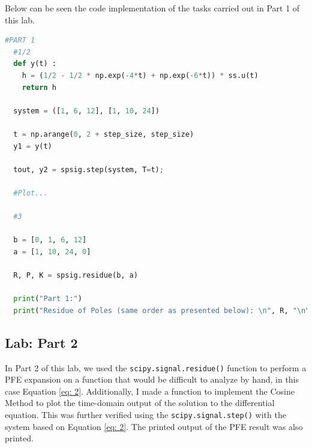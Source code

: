 \documentclass[12pt]{report}
\begin{document}
Below can be seen the code implementation of the tasks carried out in Part 1 of this lab.

\begin{lstlisting}[language=Python, basicstyle=\footnotesize]
  #PART 1
  #1/2
  def y(t) :
    h = (1/2 - 1/2 * np.exp(-4*t) + np.exp(-6*t)) * ss.u(t)
    return h

  system = ([1, 6, 12], [1, 10, 24])

  t = np.arange(0, 2 + step_size, step_size)
  y1 = y(t)        

  tout, y2 = spsig.step(system, T=t);

  #Plot...

  #3

  b = [0, 1, 6, 12]
  a = [1, 10, 24, 0]

  R, P, K = spsig.residue(b, a)

  print("Part 1:")
  print("Residue of Poles (same order as presented below): \n", R, "\n\nPoles in ascending order of mag.:\n", P, "\n\nCoefficent of Direct Polynomial Term: \n", K)
\end{lstlisting}

\subsection{Lab: Part 2}\label{section: Part2}
In Part 2 of this lab, we used the \texttt{scipy.signal.residue()} function to perform a PFE expansion on a function that would be difficult to analyze by hand, in this
case Equation \eqref{eq: 2}.
Additionally, I made a function to implement the Cosine Method to plot the time-domain output of the solution to the differential equation. This was further verified
using the \texttt{scipy.signal.step()} with the system based on Equation \eqref{eq: 2}. The printed output of the PFE result was also printed. 
\end{document}
